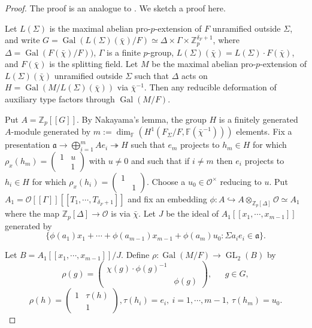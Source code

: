 \documentclass[12pt]{amsart}
\theoremstyle{plain}
\theoremstyle{definition}
\theoremstyle{remark}
\begin{document}
 \begin{proof}
 	The proof is an analogue to \cite[Section 2.2]{skinner1999residually}. We sketch a proof here. 
 	
 	Let $L(\Sigma)$ is the maximal abelian pro-$p$-extension of $F$ unramified outside $\Sigma$, and write $G=\operatorname{Gal}(L(\Sigma)(\bar{\chi})/F) \simeq \Delta \times \Gamma \times \mathbb{Z}_p^{\delta_F+1}$, where $\Delta = \operatorname{Gal}(F(\bar{\chi})/F))$, $\Gamma$ is a finite $p$-group, $L(\Sigma)(\bar{\chi}) = L(\Sigma)\cdot F(\bar{\chi}) $, and $F(\bar{\chi}) $ is the splitting field. Let $M$ be the maximal abelian pro-$p$-extension of $L(\Sigma)(\bar{\chi})$ unramified outside $\Sigma$ such that $\Delta$ acts on $H=\operatorname{Gal}(M/L(\Sigma)(\bar{\chi}))$ via $\bar{\chi}^{-1}$. Then any reducible deformation of auxiliary type factors through $\operatorname{Gal}(M/F)$.
 	
 	Put $A= \mathbb{Z}_p[[G]]$. By Nakayama's lemma, the group $H$ is a finitely generated $A$-module generated by $m:=\operatorname{dim}_{\mathbb{F}}(H^1(F_{\Sigma}/F, \mathbb{F}(\bar{\chi}^{-1}))) $ elements. Fix a presentation $\mathfrak{a} \to \bigoplus_{i=1}^m Ae_i \twoheadrightarrow H$ such that $e_m$ projects to $h_m \in H $ for which $\rho_x(h_m)=\begin{pmatrix}
 		1 & u\\
 		~ & 1
 	\end{pmatrix}$ with $u \ne 0$ and such that if $i \ne m$ then $e_i$ projects to $h_i \in H $ for which $\rho_x(h_i)=\begin{pmatrix}
 	1 & ~\\
 	~ & 1
 	\end{pmatrix}$. Choose a $u_0 \in \mathcal{O}^\times$ reducing to $u$. Put $A_1 = \mathcal{O}[[\Gamma]][[T_1, \cdots, T_{\delta_F+1}]]$ and fix an embedding $\phi:A \hookrightarrow A \otimes_{\mathbb{Z}_p[\Delta]} \mathcal{O} \simeq A_1$ where the map $\mathbb{Z}_p [\Delta]\to \mathcal{O} $
 	is via $\bar{\chi}$. Let $J$ be the ideal of $A_1[[x_1,\cdots, x_{m-1}]]$ generated by $$
 	\{\phi(a_1)x_1+\cdots+\phi(a_{m-1})x_{m-1}+\phi(a_m)u_0: \Sigma a_ie_i \in \mathfrak{a}\}.$$ 
 	
 	Let $B=A_1[[x_1,\cdots, x_{m-1}]]/J$. Define $\rho: \operatorname{Gal}(M/F) \to \operatorname{GL}_2(B)$ by$$
 	\rho (g)=\begin{pmatrix}
 		\chi(g)\cdot \phi (g)^{-1} & ~\\
 		~ & \phi(g)
 	\end{pmatrix}, ~~~~~~~g \in G, $$
 	$$\rho(h) =\begin{pmatrix}
 	1 & \tau(h)\\
 	~ & 1
 	\end{pmatrix}, \tau(h_i)=e_i, ~ i=1,\cdots,m-1, ~\tau(h_m)=u_0.
 	$$
 	 

\end{proof}
\end{document}
